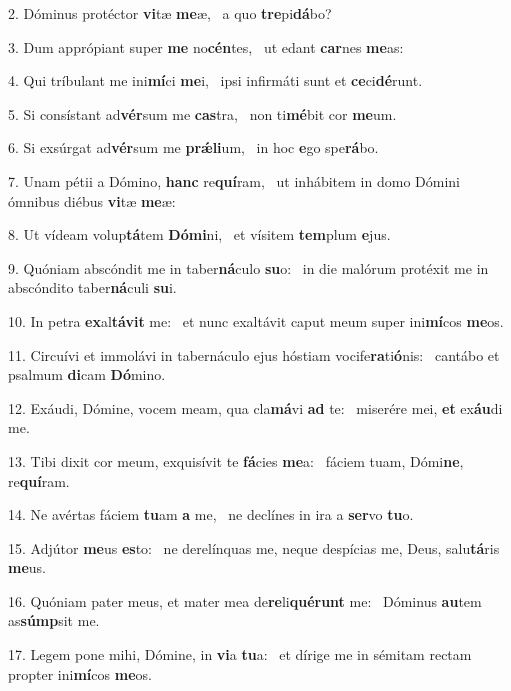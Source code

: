 2. Dóminus protéctor \textbf{vi}tæ \textbf{me}æ, \ast\  a quo \textbf{tre}pi\textbf{dá}bo?\

3. Dum apprópiant super \textbf{me} no\textbf{cén}tes, \ast\  ut edant \textbf{car}nes \textbf{me}as:\

4. Qui tríbulant me ini\textbf{mí}ci \textbf{me}i, \ast\  ipsi infirmáti sunt et \textbf{ce}ci\textbf{dé}runt.\

5. Si consístant ad\textbf{vér}sum me \textbf{cas}tra, \ast\  non ti\textbf{mé}bit cor \textbf{me}um.\

6. Si exsúrgat ad\textbf{vér}sum me \textbf{prǽ}\textbf{li}um, \ast\  in hoc \textbf{e}go spe\textbf{rá}bo.\

7. Unam pétii a Dómino, \textbf{hanc} re\textbf{quí}ram, \ast\  ut inhábitem in domo Dómini ómnibus diébus \textbf{vi}tæ \textbf{me}æ:\

8. Ut vídeam volup\textbf{tá}tem \textbf{Dó}\textbf{mi}ni, \ast\  et vísitem \textbf{tem}plum \textbf{e}jus.\

9. Quóniam abscóndit me in taber\textbf{ná}culo \textbf{su}o: \ast\  in die malórum protéxit me in abscóndito taber\textbf{ná}culi \textbf{su}i.\

10. In petra \textbf{ex}al\textbf{tá}\textbf{vit} me: \ast\  et nunc exaltávit caput meum super ini\textbf{mí}cos \textbf{me}os.\

11. Circuívi et immolávi in tabernáculo ejus hóstiam vocife\textbf{ra}ti\textbf{ó}nis: \ast\  cantábo et psalmum \textbf{di}cam \textbf{Dó}mino.\

12. Exáudi, Dómine, vocem meam, qua cla\textbf{má}vi \textbf{ad} te: \ast\  miserére mei, \textbf{et} ex\textbf{áu}di me.\

13. Tibi dixit cor meum, exquisívit te \textbf{fá}cies \textbf{me}a: \ast\  fáciem tuam, Dómi\textbf{ne}, re\textbf{quí}ram.\

14. Ne avértas fáciem \textbf{tu}am \textbf{a} me, \ast\  ne declínes in ira a \textbf{ser}vo \textbf{tu}o.\

15. Adjútor \textbf{me}us \textbf{es}to: \ast\  ne derelínquas me, neque despícias me, Deus, salu\textbf{tá}ris \textbf{me}us.\

16. Quóniam pater meus, et mater mea de\textbf{re}li\textbf{qué}\textbf{runt} me: \ast\  Dóminus \textbf{au}tem as\textbf{súmp}sit me.\

17. Legem pone mihi, Dómine, in \textbf{vi}a \textbf{tu}a: \ast\  et dírige me in sémitam rectam propter ini\textbf{mí}cos \textbf{me}os.\

